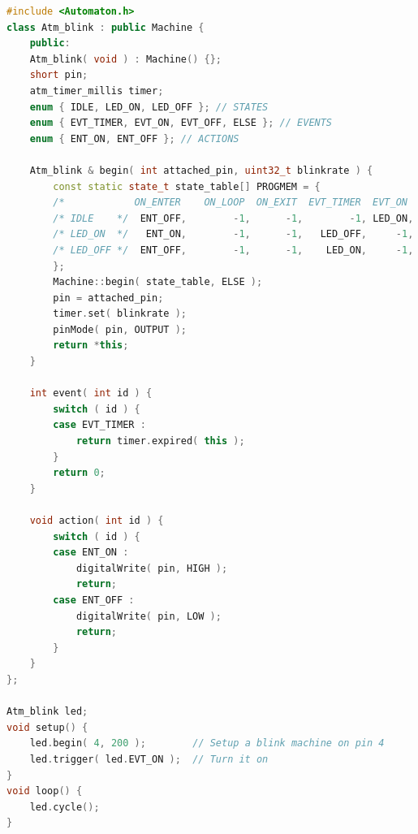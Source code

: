\begin{lstlisting}[language=c++]      
#include <Automaton.h>
class Atm_blink : public Machine {
    public:
    Atm_blink( void ) : Machine() {};
    short pin;
    atm_timer_millis timer;
    enum { IDLE, LED_ON, LED_OFF }; // STATES
    enum { EVT_TIMER, EVT_ON, EVT_OFF, ELSE }; // EVENTS
    enum { ENT_ON, ENT_OFF }; // ACTIONS

    Atm_blink & begin( int attached_pin, uint32_t blinkrate ) {
        const static state_t state_table[] PROGMEM = {
        /*            ON_ENTER    ON_LOOP  ON_EXIT  EVT_TIMER  EVT_ON  EVT_OFF  ELSE */
        /* IDLE    */  ENT_OFF,        -1,      -1,        -1, LED_ON,      -1,   -1,
        /* LED_ON  */   ENT_ON,        -1,      -1,   LED_OFF,     -1,    IDLE,   -1,
        /* LED_OFF */  ENT_OFF,        -1,      -1,    LED_ON,     -1,    IDLE,   -1,
        };
        Machine::begin( state_table, ELSE );
        pin = attached_pin;
        timer.set( blinkrate );
        pinMode( pin, OUTPUT );
        return *this;
    }

    int event( int id ) {
        switch ( id ) {
        case EVT_TIMER :
            return timer.expired( this );
        }
        return 0;
    }

    void action( int id ) {
        switch ( id ) {
        case ENT_ON :
            digitalWrite( pin, HIGH );
            return;
        case ENT_OFF :
            digitalWrite( pin, LOW );
            return;
        }
    }
};

Atm_blink led;
void setup() {
    led.begin( 4, 200 );        // Setup a blink machine on pin 4
    led.trigger( led.EVT_ON );  // Turn it on
}
void loop() {
    led.cycle();
}
\end{lstlisting}

